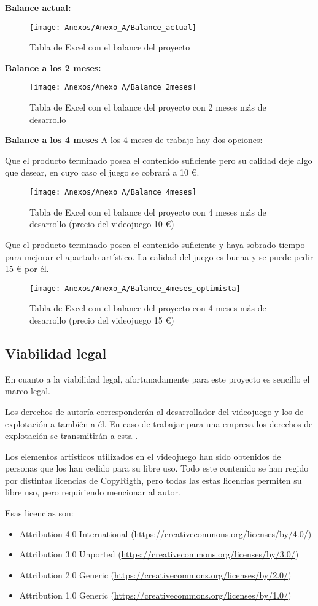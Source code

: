\textbf{Balance actual:}
\begin{figure}[h]
\centering
\texttt{[image: Anexos/Anexo\_A/Balance\_actual]}
\caption{Tabla de Excel con el balance del proyecto}
\end{figure}

\textbf{Balance a los 2 meses:}
\begin{figure}[h]
\centering
\texttt{[image: Anexos/Anexo\_A/Balance\_2meses]}
\caption{Tabla de Excel con el balance del proyecto con 2 meses más de desarrollo}
\end{figure}

\textbf{Balance a los 4 meses}
A los 4 meses de trabajo hay dos opciones:

Que el producto terminado posea el contenido suficiente pero su calidad deje algo que desear, en cuyo caso el juego se cobrará a 10 €.

\clearpage
\begin{figure}[h]
\centering
\texttt{[image: Anexos/Anexo\_A/Balance\_4meses]}
\caption{Tabla de Excel con el balance del proyecto con 4 meses más de desarrollo (precio del videojuego 10 €)}
\end{figure}

Que el producto terminado posea el contenido suficiente y haya sobrado tiempo para mejorar el apartado artístico. La calidad del juego es buena y se puede pedir 15 € por él.
\begin{figure}[h]
\centering
\texttt{[image: Anexos/Anexo\_A/Balance\_4meses\_optimista]}
\caption{Tabla de Excel con el balance del proyecto con 4 meses más de desarrollo (precio del videojuego 15 €)}
\end{figure}

\subsection{Viabilidad legal}
En cuanto a la viabilidad legal, afortunadamente para este proyecto es sencillo el marco legal.

Los derechos de autoría corresponderán al desarrollador del videojuego y los de explotación a también a él. En caso de trabajar para una empresa los derechos de explotación se transmitirán a esta \cite{PropiedadIntelectual}.

Los elementos artísticos utilizados en el videojuego han sido obtenidos de personas que los han cedido para su libre uso. Todo este contenido se han regido por distintas licencias de CopyRigth, pero todas las estas licencias permiten su libre uso, pero requiriendo mencionar al autor.

\clearpage
Esas licencias son:
\begin{itemize}
\item
Attribution 4.0 International (\url{https://creativecommons.org/licenses/by/4.0/})
\item
Attribution 3.0 Unported (\url{https://creativecommons.org/licenses/by/3.0/})
\item
Attribution 2.0 Generic (\url{https://creativecommons.org/licenses/by/2.0/})
\item
Attribution 1.0 Generic (\url{https://creativecommons.org/licenses/by/1.0/})
\end{itemize}